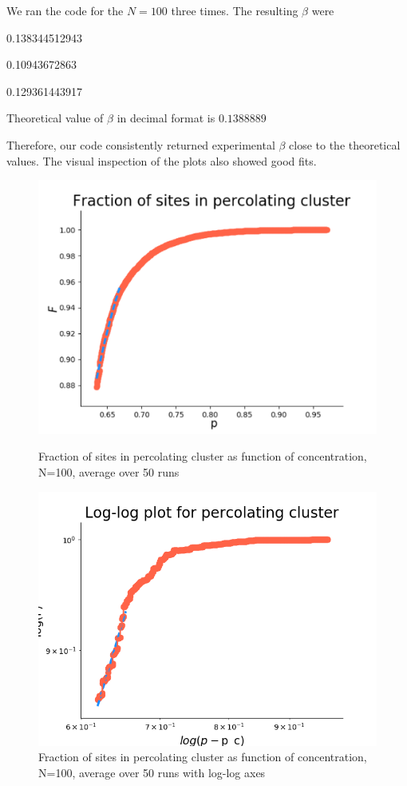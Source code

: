 \documentclass[12pt]{article}
\begin{document}
We ran the code for the $N=100$ three times. The resulting $\beta$ were
\item 0.138344512943
\item 0.10943672863
\item 0.129361443917

Theoretical value of $\beta$ in decimal format is $0.1388889$

Therefore, our code consistently returned experimental $\beta$ close to the theoretical values. The visual inspection of the plots also showed good fits.

\begin{figure}[!htb]
  \includegraphics[width=\linewidth]{fractionFwithFit10percN100Axis.png}
  \caption{Fraction of sites in percolating cluster as function of concentration, N=100, average over 50 runs}\label{fig:fraction100}
\endminipage\hfill
{}
  \includegraphics[width=\linewidth]{fractionFwithFit10percN100loglog.png}
  \caption{Fraction of sites in percolating cluster as function of concentration, N=100, average over 50 runs with log-log axes}\label{fig:fraction100log}
\endminipage\hfill
\end{figure}
\end{document}

